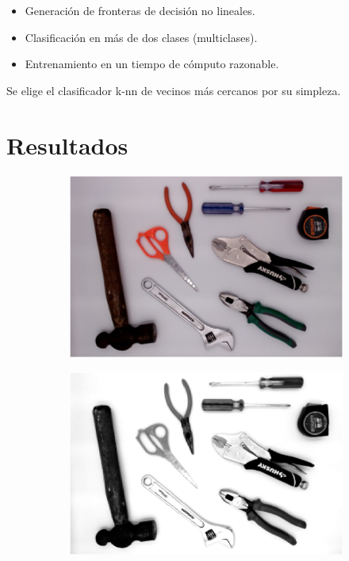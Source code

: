 \documentclass[a4paper, 11pt]{article}
\begin{document}
\begin{itemize}
\item Generación de fronteras de decisión no lineales.
\item Clasificación en más de dos clases (multiclases).
\item Entrenamiento en un tiempo de cómputo razonable. 
\end{itemize}

Se elige el clasificador k-nn de vecinos más cercanos por su simpleza.

\newpage
\section{Resultados}

\begin{figure}[h]
  \centering
  \begin{subfigure}{0.45\linewidth}
    \includegraphics[width=\linewidth]{paso1} 
    \caption{}
    \label{fig:1a}
  \end{subfigure}\hfill
  \begin{subfigure}{0.45\linewidth}
    \includegraphics[width=\linewidth]{paso2}
    \caption{}
    \label{fig:1a}
  \end{subfigure}
  

\end{figure}
\end{document}
